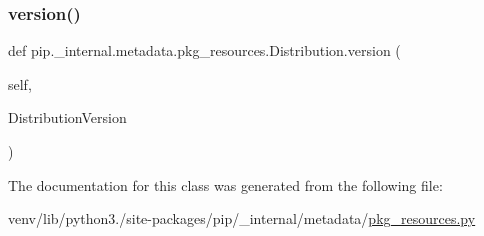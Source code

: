 \subsubsection{\texorpdfstring{version()}{version()}}
{\footnotesize\ttfamily def pip.\+\_\+internal.\+metadata.\+pkg\+\_\+resources.\+Distribution.\+version (\begin{DoxyParamCaption}\item[{}]{self,  }\item[{}]{Distribution\+Version }\end{DoxyParamCaption})}



The documentation for this class was generated from the following file\+:\begin{DoxyCompactItemize}
\item 
venv/lib/python3./site-\/packages/pip/\+\_\+internal/metadata/\hyperlink{metadata_2pkg__resources_8py}{pkg\+\_\+resources.\+py}\end{DoxyCompactItemize}
